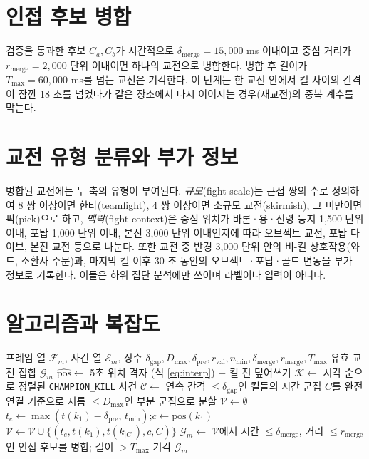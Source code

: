 \section{인접 후보 병합}
\label{sec:loc-merge}

검증을 통과한 후보 $C_a, C_b$가 시간적으로 $\delta_{\mathrm{merge}} = 15{,}000$ ms 이내이고 중심 거리가 $r_{\mathrm{merge}} = 2{,}000$ 단위 이내이면 하나의 교전으로 병합한다. 병합 후 길이가 $T_{\max} = 60{,}000$ ms를 넘는 교전은 기각한다. 이 단계는 한 교전 안에서 킬 사이의 간격이 잠깐 18 초를 넘었다가 같은 장소에서 다시 이어지는 경우(재교전)의 중복 계수를 막는다.

\section{교전 유형 분류와 부가 정보}
\label{sec:loc-classify}

병합된 교전에는 두 축의 유형이 부여된다. \emph{규모}(fight scale)는 근접 쌍의 수로 정의하여 8 쌍 이상이면 한타(teamfight), 4 쌍 이상이면 소규모 교전(skirmish), 그 미만이면 픽(pick)으로 하고, \emph{맥락}(fight context)은 중심 위치가 바론·용·전령 둥지 1{,}500 단위 이내, 포탑 1{,}000 단위 이내, 본진 3{,}000 단위 이내인지에 따라 오브젝트 교전, 포탑 다이브, 본진 교전 등으로 나눈다. 또한 교전 중 반경 3{,}000 단위 안의 비-킬 상호작용(와드, 소환사 주문)과, 마지막 킬 이후 30 초 동안의 오브젝트·포탑·골드 변동을 부가 정보로 기록한다. 이들은 하위 집단 분석에만 쓰이며 라벨이나 입력이 아니다.

\section{알고리즘과 복잡도}
\label{sec:loc-algorithm}

\begin{algorithm}[htbp]
\caption{킬 조건부 교전 국소화 (\texttt{teamfight\_v2})}
\label{alg:localization}
\begin{algorithmic}[1]
\Require 프레임 열 $\mathcal{F}_m$, 사건 열 $\mathcal{E}_m$, 상수 $\delta_{\mathrm{gap}}, D_{\max}, \delta_{\mathrm{pre}}, r_{\mathrm{val}}, n_{\min}, \delta_{\mathrm{merge}}, r_{\mathrm{merge}}, T_{\max}$
\Ensure 유효 교전 집합 $\mathcal{G}_m$
\State $\widehat{\mathrm{pos}} \gets$ 5초 위치 격자 (식 \eqref{eq:interp}) + 킬 전 덮어쓰기 
\State $\mathcal{K} \gets$ 시각 순으로 정렬된 \texttt{CHAMPION\_KILL} 사건
\State $\mathcal{C} \gets$ 연속 간격 $\le \delta_{\mathrm{gap}}$인 킬들의 시간 군집 
  \State $C$를 완전 연결 기준으로 지름 $\le D_{\max}$인 부분 군집으로 분할 
\EndFor
\State $\mathcal{V} \gets \emptyset$
  \State $t_e \gets \max(t(k_1) - \delta_{\mathrm{pre}},\, t_{\min})$;\quad $c \gets \mathrm{pos}(k_1)$
    \State $\mathcal{V} \gets \mathcal{V} \cup \{(t_e, t(k_1), t(k_{|C|}), c, C)\}$
  \EndIf
\EndFor
\State $\mathcal{G}_m \gets$ $\mathcal{V}$에서 시간 $\le \delta_{\mathrm{merge}}$, 거리 $\le r_{\mathrm{merge}}$인 인접 후보를 병합; 길이 $> T_{\max}$ 기각
\State \Return $\mathcal{G}_m$
\end{algorithmic}
\end{algorithm}

